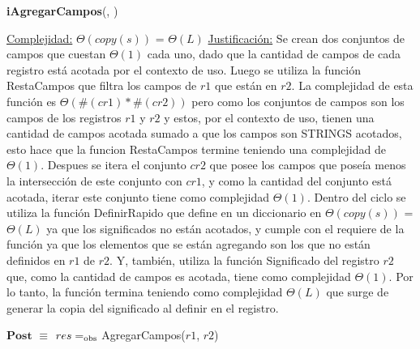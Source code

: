 \begin{algorithm}[H]{{\textbf{iAgregarCampos}(, )}}
\begin{algorithmic}[1]
			\medskip
			\Statex \underline{Complejidad:} $\Theta(copy(s))$ = $\Theta(L)$
			\Statex \underline{Justificación:} Se crean dos conjuntos de campos que cuestan $\Theta(1)$ cada uno, dado que la cantidad de campos de cada registro está acotada por el contexto de uso. Luego se utiliza la función RestaCampos que filtra los campos de $r1$ que están en $r2$. La complejidad de esta función es $\Theta(\#(cr1) * \#(cr2))$ pero como los conjuntos de campos son los campos de los registros $r1$ y $r2$ y estos, por el contexto de uso, tienen una cantidad de campos acotada sumado a que los campos son STRINGS acotados, esto hace que la funcion RestaCampos termine teniendo una complejidad de $\Theta(1)$. Despues se itera el conjunto $cr2$ que posee los campos que poseía menos la intersección de este conjunto con $cr1$, y como la cantidad del conjunto está acotada, iterar este conjunto tiene como complejidad $\Theta(1)$. Dentro del ciclo se utiliza la función DefinirRapido que define en un diccionario en $\Theta(copy(s))$ = $\Theta(L)$ ya que los significados no están acotados, y cumple con el requiere de la función ya que los elementos que se están agregando son los que no están definidos en $r1$ de $r2$. Y, también, utiliza la función Significado del registro $r2$ que, como la cantidad de campos es acotada, tiene como complejidad $\Theta(1)$. Por lo tanto, la función termina teniendo como complejidad $\Theta(L)$ que surge de generar la copia del significado al definir en el registro.

    	\end{algorithmic}
	{$\textbf{Post}$ $\equiv$ $res =_{\mathrm{obs}}$ AgregarCampos($r1$, $r2$)}
\end{algorithm}


